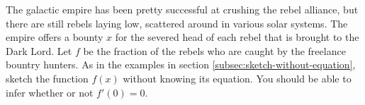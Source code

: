 The galactic empire has been pretty successful at crushing the
rebel alliance, but there are still rebels laying low, scattered
around in various solar systems. The empire offers a bounty $x$
for the severed head of each rebel that is brought to the Dark Lord.
Let $f$ be the fraction of the rebels who are caught by the freelance
bountry hunters.
As in the examples
in section \ref{subsec:sketch-without-equation}, sketch the function
$f(x)$ without knowing its equation. You should be able to infer whether
or not $f'(0)=0$.
